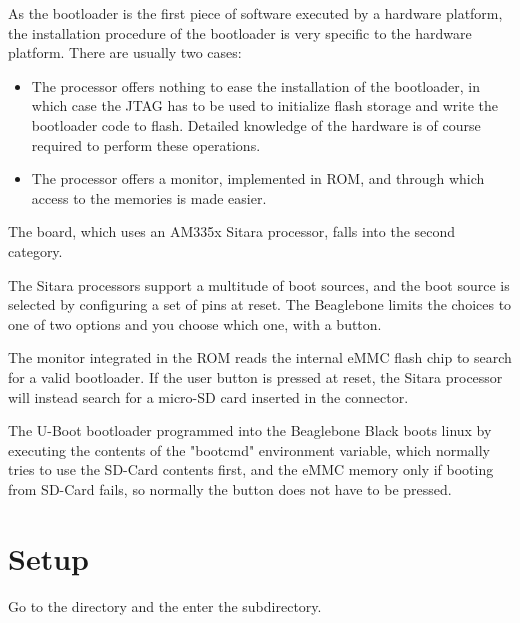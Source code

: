 
As the bootloader is the first piece of software executed by a
hardware platform, the installation procedure of the bootloader is
very specific to the hardware platform. There are usually two cases:

\begin{itemize}

\item The processor offers nothing to ease the installation of the
  bootloader, in which case the JTAG has to be used to initialize
  flash storage and write the bootloader code to flash. Detailed
  knowledge of the hardware is of course required to perform these
  operations.

\item The processor offers a monitor, implemented in ROM, and through
  which access to the memories is made easier.

\end{itemize}

The \devboard board, which uses an AM335x Sitara processor, falls into
the second category. 

The Sitara processors support a multitude of boot sources, and the boot
source is selected by configuring a set of pins at reset.
The Beaglebone limits the choices to one of two options and you choose
which one, with a button.

The monitor integrated in the ROM reads the internal
eMMC flash chip to search for a valid bootloader.
If the user button is pressed at reset, the Sitara processor will instead search
for a micro-SD card inserted in the connector.

The U-Boot bootloader programmed into the Beaglebone Black boots linux
by executing the contents of the "bootcmd" environment variable, 
which normally tries to use the SD-Card contents first, and the eMMC memory
only if booting from SD-Card fails, so normally the button does not have to be pressed.


\clearpage
\section{Setup}

Go to the \labdir directory and the enter the  subdirectory.

